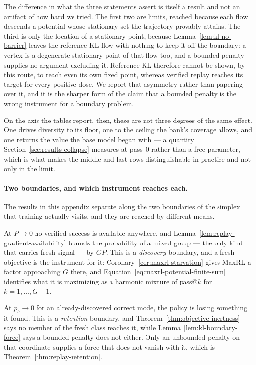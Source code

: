 \documentclass{article}
\newcommand{\1}{\mathbf 1}
\theoremstyle{remark}
\theoremstyle{definition}
\theoremstyle{plain}
\begin{document}
The difference in what the three statements assert is itself a result and not
an artifact of how hard we tried. The first two are limits, reached because
each flow descends a potential whose stationary set the trajectory provably
attains. The third is only the location of a stationary point, because
Lemma~\ref{lem:kl-no-barrier} leaves the reference-KL flow with nothing to
keep it off the boundary: a vertex is a degenerate stationary point of that
flow too, and a bounded penalty supplies no argument excluding it. Reference KL
therefore cannot be shown, by this route, to reach even its own fixed point,
whereas verified replay reaches its target for every positive dose. We report
that asymmetry rather than papering over it, and it is the sharper form of the
claim that a bounded penalty is the wrong instrument for a boundary problem.

On the axis the tables report, then, these are not three degrees of the same
effect. One drives diversity to its floor, one to the ceiling the bank's coverage
allows, and one returns the value the base model began with --- a quantity
Section~\ref{sec:results-collapse} measures at pass~0 rather than a free
parameter, which is what makes the middle and last rows distinguishable in
practice and not only in the limit.

\paragraph{Two boundaries, and which instrument reaches each.}
The results in this appendix separate along the two boundaries of the simplex
that training actually visits, and they are reached by different means.

At $P\to0$ no verified success is available anywhere, and
Lemma~\ref{lem:replay-gradient-availability} bounds the probability of a
mixed group --- the only kind that carries fresh signal --- by $GP$. This is a
\emph{discovery} boundary, and a fresh objective is the instrument for it:
Corollary~\ref{cor:maxrl-starvation} gives MaxRL a factor approaching $G$
there, and Equation~\eqref{eq:maxrl-potential-finite-sum} identifies what it
is maximizing as a harmonic mixture of pass@$k$ for $k=1,\ldots,G-1$.

At $p_b\to0$ for an already-discovered correct mode, the policy is losing
something it found. This is a \emph{retention} boundary, and
Theorem~\ref{thm:objective-inertness} says no member of the fresh class
reaches it, while Lemma~\ref{lem:kl-boundary-force} says a bounded penalty
does not either. Only an unbounded penalty on that coordinate supplies a force
that does not vanish with it, which is Theorem~\ref{thm:replay-retention}.
\end{document}
